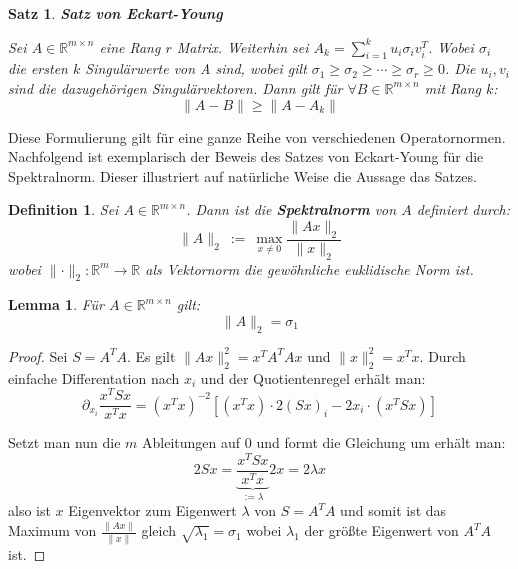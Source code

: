 \documentclass{article}
\newcommand{\R}[0]{\mathbb{R}}
\newtheorem{defin}{Definition}
\newtheorem{lemma}{Lemma}
\newtheorem{thm}{Satz}
\begin{document}
\begin{thm} \textbf{Satz von Eckart-Young} \cite[S. 58f.]{strang2019linear}
    
    Sei $A \in \R^{m\times n}$ eine Rang $r$ Matrix. Weiterhin sei $A_k = \sum\limits_{i=1}^k u_i\sigma_iv_i^T$. 
    Wobei $\sigma_i$ die ersten $k$ Singulärwerte von A sind, wobei gilt $\sigma_1 \geq \sigma_2 \geq \cdots \geq \sigma_r \geq 0$. Die $u_i, v_i$ sind die dazugehörigen Singulärvektoren. 
    Dann gilt für $\forall B \in \R^{m \times n}$ mit Rang $k$:
    \begin{equation}
        \lVert A - B \rVert \geq \lVert A - A_k \rVert
    \end{equation}
\end{thm}

Diese Formulierung gilt für eine ganze Reihe von verschiedenen Operatornormen.
Nachfolgend ist exemplarisch der Beweis des Satzes von Eckart-Young für die Spektralnorm.
Dieser illustriert auf natürliche Weise die Aussage das Satzes.

\begin{defin}
    Sei $A \in \R^{m \times n}$. Dann ist die \textbf{Spektralnorm} von $A$ definiert durch:
    \begin{equation}
        \lVert A \rVert_2 \: := \: \max\limits_{x \neq 0} \frac{\lVert Ax \rVert_2}{\lVert x \rVert_2}
    \end{equation}
    wobei $\lVert \cdot \rVert_2: \R^m \to \R$ als Vektornorm die gewöhnliche euklidische Norm ist.
\end{defin}

\begin{lemma}
    Für $A \in \R^{m \times n}$ gilt:
    \begin{equation}
        \lVert A \rVert_2 = \sigma_1
    \end{equation}
\end{lemma}

\begin{proof}\cite[S. 62f.]{strang2019linear}
    Sei $S = A^TA$. Es gilt $\lVert Ax \rVert_2^2 = x^TA^TAx$ und $\lVert x \rVert_2^2 = x^Tx$.
    Durch einfache Differentation nach $x_i$ und der Quotientenregel erhält man:
    \begin{equation}
        \partial_{x_i}\frac{x^TSx}{x^Tx} = (x^Tx)^{-2}\left[ (x^Tx) \cdot 2(Sx)_i - 2x_i \cdot (x^TSx) \right]
    \end{equation}

    Setzt man nun die $m$ Ableitungen auf $0$ und formt die Gleichung um erhält man:
    \begin{equation}
        2Sx = \underbrace{\frac{x^TSx}{x^Tx}}_{:= \lambda} 2x = 2\lambda x
    \end{equation}
    also ist $x$ Eigenvektor zum Eigenwert $\lambda$ von $S = A^TA$ und
    somit ist das Maximum von $\frac{\lVert Ax \rVert}{\lVert x \rVert}$ gleich $\sqrt{\lambda_1} = \sigma_1$ wobei $\lambda_1$ der größte Eigenwert von $A^TA$ ist.
\end{proof}
\end{document}
